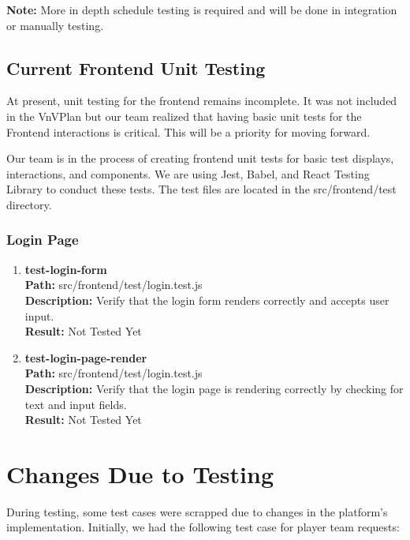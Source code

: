 \documentclass[12pt, titlepage]{article}
\begin{document}
\textbf{Note:} More in depth schedule testing is required and will be done in integration or manually testing.

\subsection{Current Frontend Unit Testing}

At present, unit testing for the frontend remains incomplete. It was not included in the VnVPlan but our team realized that having basic unit tests for the Frontend interactions is critical. This will be a priority for moving forward.

Our team is in the process of creating frontend unit tests for basic test displays, interactions, and components. We are using Jest, Babel, and React Testing Library to conduct these tests. The test files are located in the src/frontend/test directory.

\subsubsection{Login Page}

\begin{enumerate}
    \item{\textbf{test-login-form}\\}
        \textbf{Path:} src/frontend/test/login.test.js\\
        \textbf{Description:} Verify that the login form renders correctly and accepts user input.\\
        \textbf{Result:} Not Tested Yet

    \item{\textbf{test-login-page-render}\\}
        \textbf{Path:} src/frontend/test/login.test.js\\
        \textbf{Description:} Verify that the login page is rendering correctly by checking for text and input fields.\\
        \textbf{Result:} Not Tested Yet
\end{enumerate}

\section{Changes Due to Testing}



During testing, some test cases were scrapped due to changes in the platform's implementation. Initially, we had the following test case for player team requests:\\
\end{document}
